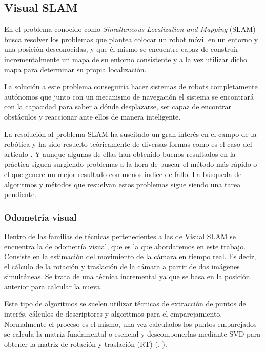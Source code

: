 \subsection{Visual SLAM}

En el problema conocido como \textit{Simultaneous Localization and Mapping} (SLAM) busca resolver los problemas que plantea colocar un robot móvil en un entorno y una posición desconocidas, y que él mismo se encuentre capaz de construir incrementalmente un mapa de su entorno consistente y a la vez utilizar dicho mapa para determinar su propia localización.

La solución a este problema conseguiría hacer sistemas de robots completamente autónomos que junto con un mecanismo de navegación el sistema se encontrará con la capacidad para saber a dónde desplazarse, ser capaz de encontrar obstáculos y reaccionar ante ellos de manera inteligente.

La resolución al problema SLAM ha suscitado un gran interés en el campo de la robótica y ha sido resuelto teóricamente de diversas formas como es el caso del artículo \parencite{Reference1}. Y aunque algunas de ellas han obtenido buenos resultados en la práctica siguen surgiendo problemas a la hora de buscar el método más rápido o el que genere un mejor resultado con menos índice de fallo. La búsqueda de algoritmos y métodos que resuelvan estos problemas sigue siendo una tarea pendiente.

\subsubsection{Odometría visual}

Dentro de las familias de técnicas pertenecientes a las de Visual SLAM se encuentra la de odometría visual, que es la que abordaremos en este trabajo. Consiste en la estimación del movimiento de la cámara en tiempo real. Es decir, el cálculo de la rotación y traslación de la cámara a partir de dos imágenes simultáneas. Se trata de una técnica incremental ya que se basa en la posición anterior para calcular la nueva.

Este tipo de algoritmos se suelen utilizar técnicas de extracción de puntos de interés, cálculos de descriptores y algoritmos para el emparejamiento. Normalmente el proceso es el mismo, una vez calculados los puntos emparejados se calcula la matriz fundamental o esencial y descomponerlas mediante SVD para obtener la matriz de rotación y traslación (RT) (\cite{Reference3}. \cite{Reference4}).

